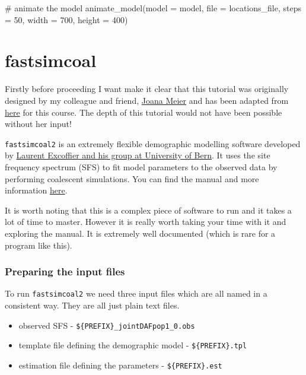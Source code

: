 \documentclass[
  letterpaper,
  DIV=11,
  numbers=noendperiod]{scrartcl}
\newenvironment{Shaded}{\begin{snugshade}}{\end{snugshade}}
\newcommand{\AttributeTok}[1]{\textcolor[rgb]{0.40,0.45,0.13}{#1}}
\newcommand{\CommentTok}[1]{\textcolor[rgb]{0.37,0.37,0.37}{#1}}
\newcommand{\DecValTok}[1]{\textcolor[rgb]{0.68,0.00,0.00}{#1}}
\newcommand{\FunctionTok}[1]{\textcolor[rgb]{0.28,0.35,0.67}{#1}}
\newcommand{\NormalTok}[1]{\textcolor[rgb]{0.00,0.23,0.31}{#1}}
\providecommand{\tightlist}{%
  \setlength{\itemsep}{0pt}\setlength{\parskip}{0pt}}\usepackage{longtable,booktabs,array}
\begin{document}
\begin{Shaded}
\begin{Highlighting}[]
\CommentTok{\# animate the model}
\FunctionTok{animate\_model}\NormalTok{(}\AttributeTok{model =}\NormalTok{ model, }\AttributeTok{file =}\NormalTok{ locations\_file, }\AttributeTok{steps =} \DecValTok{50}\NormalTok{, }\AttributeTok{width =} \DecValTok{700}\NormalTok{, }\AttributeTok{height =} \DecValTok{400}\NormalTok{)}
\end{Highlighting}
\end{Shaded}

\hypertarget{fastsimcoal}{%
\section{fastsimcoal}\label{fastsimcoal}}

Firstly before proceeding I want make it clear that this tutorial was
originally designed by my colleague and friend,
\href{https://www.sanger.ac.uk/person/meier-joana/}{Joana Meier} and has
been adapted from
\href{https://speciationgenomics.github.io/fastsimcoal2/}{here} for this
course. The depth of this tutorial would not have been possible without
her input!

\texttt{fastsimcoal2} is an extremely flexible demographic modelling
software developed by
\href{http://www.cmpg.iee.unibe.ch/about_us/team/researchers/prof_dr_excoffier_laurent/index_eng.html}{Laurent
Excoffier and his group at University of Bern}. It uses the site
frequency spectrum (SFS) to fit model parameters to the observed data by
performing coalescent simulations. You can find the manual and more
information \href{http://cmpg.unibe.ch/software/fastsimcoal2/}{here}.

It is worth noting that this is a complex piece of software to run and
it takes a lot of time to master. However it is really worth taking your
time with it and exploring the manual. It is extremely well documented
(which is rare for a program like this).

\hypertarget{preparing-the-input-files}{%
\subsubsection{Preparing the input
files}\label{preparing-the-input-files}}

To run \texttt{fastsimcoal2} we need three input files which are all
named in a consistent way. They are all just plain text files.

\begin{itemize}
\tightlist
\item
  observed SFS - \texttt{\$\{PREFIX\}\_jointDAFpop1\_0.obs}
\item
  template file defining the demographic model -
  \texttt{\$\{PREFIX\}.tpl}
\item
  estimation file defining the parameters - \texttt{\$\{PREFIX\}.est}
\end{itemize}
\end{document}
